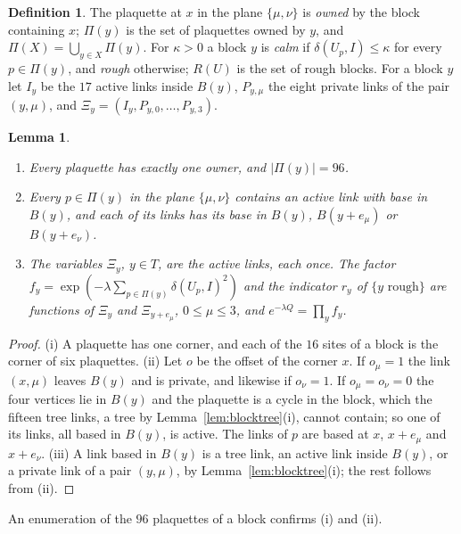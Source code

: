 \documentclass[11pt]{amsart}
\newtheorem{lemma}[theorem]{Lemma}
\theoremstyle{definition}
\newtheorem{definition}[theorem]{Definition}
\theoremstyle{remark}
\numberwithin{equation}{section}
\begin{document}
\begin{definition}\label{def:lfrough}
The plaquette at $x$ in the plane $\{\mu,\nu\}$ is \emph{owned} by the block
containing $x$; $\Pi(y)$ is the set of plaquettes owned by $y$, and
$\Pi(X)=\bigcup_{y\in X}\Pi(y)$. For $\kappa>0$ a block $y$ is \emph{calm}
if $\delta(U_p,I)\le\kappa$ for every $p\in\Pi(y)$, and \emph{rough}
otherwise; $R(U)$ is the set of rough blocks. For a block $y$ let $I_y$ be
the $17$ active links inside $B(y)$, $P_{y,\mu}$ the eight private links of
the pair $(y,\mu)$, and $\varXi_y=(I_y,P_{y,0},\dots,P_{y,3})$.
\end{definition}

\begin{lemma}\label{lem:lfowned}
\begin{enumerate}[label=\textup{(\roman*)},leftmargin=*]
\item Every plaquette has exactly one owner, and $|\Pi(y)|=96$.
\item Every $p\in\Pi(y)$ in the plane $\{\mu,\nu\}$ contains an active link
with base in $B(y)$, and each of its links has its base in $B(y)$,
$B(y+e_\mu)$ or $B(y+e_\nu)$.
\item The variables $\varXi_y$, $y\in T$, are the active links, each once.
The factor $f_y=\exp(-\lambda\sum_{p\in\Pi(y)}\delta(U_p,I)^2)$ and the
indicator $r_y$ of $\{y\text{ rough}\}$ are functions of $\varXi_y$ and
$\varXi_{y+e_\mu}$, $0\le\mu\le3$, and $e^{-\lambda Q}=\prod_yf_y$.
\end{enumerate}
\end{lemma}

\begin{proof}
(i) A plaquette has one corner, and each of the $16$ sites of a block is
the corner of six plaquettes. (ii) Let $o$ be the offset of the corner $x$.
If $o_\mu=1$ the link $(x,\mu)$ leaves $B(y)$ and is private, and likewise
if $o_\nu=1$. If $o_\mu=o_\nu=0$ the four vertices lie in $B(y)$ and the
plaquette is a cycle in the block, which the fifteen tree links, a tree by
Lemma~\ref{lem:blocktree}(i), cannot contain; so one of its links, all
based in $B(y)$, is active. The links of $p$ are based at $x$, $x+e_\mu$ and
$x+e_\nu$. (iii) A link based in $B(y)$ is a tree link, an active link inside
$B(y)$, or a private link of a pair $(y,\mu)$, by
Lemma~\ref{lem:blocktree}(i); the rest follows from (ii).
\end{proof}

An enumeration of the $96$ plaquettes of a block confirms (i) and (ii).
\end{document}
